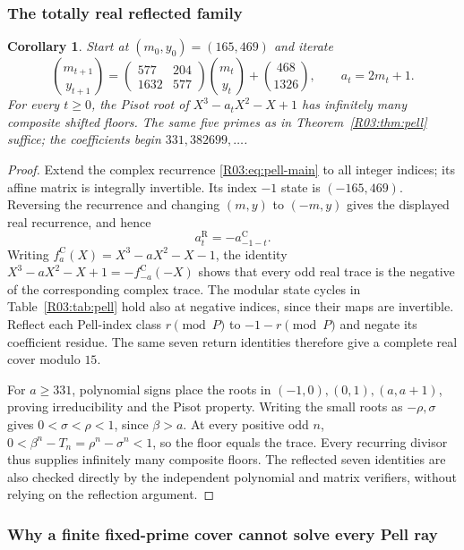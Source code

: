 \documentclass[11pt,a4paper]{article}
\newtheorem{corollary}[theorem]{Corollary}\newtheorem{mainthm}[theorem]{Theorem}
\theoremstyle{definition}\newtheorem{definition}[theorem]{Definition}
\theoremstyle{remark}\newtheorem{remark}[theorem]{Remark}
\begin{document}
\subsubsection{The totally real reflected family}

\begin{corollary}\label{R03:cor:real-reflection}
Start at $(m_0,y_0)=(165,469)$ and iterate
\[
 \binom{m_{t+1}}{y_{t+1}}
 =\begin{pmatrix}577&204\\1632&577\end{pmatrix}\binom{m_t}{y_t}
 +\binom{468}{1326},\qquad a_t=2m_t+1.
\]
For every $t\ge0$, the Pisot root of $X^3-a_tX^2-X+1$ has infinitely
many composite shifted floors. The same five primes as in
Theorem~\ref{R03:thm:pell} suffice; the coefficients begin
$331,382699,\ldots$.
\end{corollary}
\begin{proof}
Extend the complex recurrence \eqref{R03:eq:pell-main} to all integer
indices; its affine matrix is integrally invertible. Its index $-1$
state is $(-165,469)$. Reversing the recurrence and changing
$(m,y)$ to $(-m,y)$ gives the displayed real recurrence, and hence
\[
 a_t^{\mathrm R}=-a_{-1-t}^{\mathrm C}.
\]
Writing $f_a^{\mathrm C}(X)=X^3-aX^2-X-1$, the identity
$X^3-aX^2-X+1=-f_{-a}^{\mathrm C}(-X)$ shows that every odd real
trace is the negative of the corresponding complex trace.
The modular state cycles in Table~\ref{R03:tab:pell} hold also at negative
indices, since their maps are invertible. Reflect each Pell-index
class $r\pmod P$ to $-1-r\pmod P$ and negate its coefficient residue.
The same seven return identities therefore give a complete real
cover modulo $15$.

For $a\ge331$, polynomial signs place the roots in
$(-1,0),(0,1),(a,a+1)$, proving irreducibility and the Pisot property.
Writing the small roots as $-\rho,\sigma$ gives
$0<\sigma<\rho<1$, since $\beta>a$.
At every positive odd $n$,
$0<\beta^n-T_n=\rho^n-\sigma^n<1$, so the floor equals the trace.
Every recurring divisor thus supplies infinitely many composite
floors. The reflected seven identities are also checked directly by
the independent polynomial and matrix verifiers, without relying on
the reflection argument.
\end{proof}

\subsubsection{Why a finite fixed-prime cover cannot solve every Pell ray}
\end{document}
